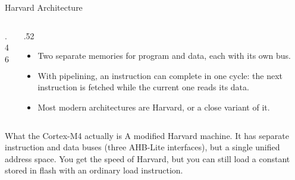\documentclass[9pt,aspectratio=169,xcolor=table]{beamer}
\begin{document}
\begin{frame}{Harvard Architecture}
    \begin{columns}[c]
    \begin{column}{.46\textwidth}
        \begin{center}
        \end{center}
    \end{column}
    \begin{column}{.52\textwidth}
        \begin{itemize}
            \item \alert{Two separate memories} for program and data, each with its own bus.
            \item With pipelining, an instruction can complete in \alert{one cycle}: the next instruction is fetched while the current one reads its data.
            \item Most modern architectures are Harvard, or a close variant of it.
        \end{itemize}
    \end{column}
    \end{columns}
    \vspace{2mm}
    \begin{block}{What the Cortex-M4 actually is}
        A \alert{modified Harvard} machine. It has separate instruction and data buses (three AHB-Lite interfaces), but a \alert{single unified address space}. You get the speed of Harvard, but you can still load a constant stored in flash with an ordinary load instruction.
    \end{block}
\end{frame}
\end{document}
